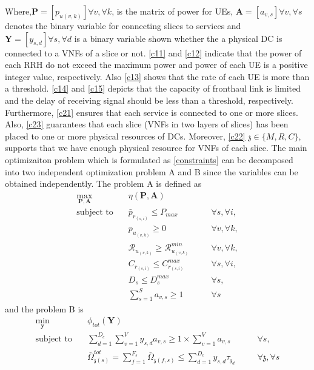 \documentclass[conference]{IEEEtran}
\begin{document}
Where,$\boldsymbol{P} =[p_{u(v,k)}]  \forall v , \forall k $, is the matrix of power for UEs, $\boldsymbol{A} =[a_{v,s}]  \forall v , \forall s $ denotes the binary variable for connecting slices to services and $\boldsymbol{Y} =[y_{s,d}]   \forall s ,  \forall d $ is a binary variable shown whether 
the a physical DC is connected to a VNFs of a slice or not. 
\eqref{c11} and \eqref{c12} indicate that the power of each RRH do not exceed the maximum power and power of each UE is a positive integer value, respectively. Also \eqref{c13} shows that the rate of each UE is more than a threshold. \eqref{c14} and \eqref{c15} depicts that the capacity of fronthaul link is limited and the delay of receiving signal should be less than a threshold, respectively.  
Furthermore, \eqref{c21}
ensures that each service is connected to one or more slices.
Also, \eqref{c23} guarantees that each slice (VNFs in two layers of slices) has been placed to one or more physical resources of DCs. Moreover, \eqref{c22}  $\mathfrak{z}\in \{M,R,C\}$, supports 
that we have enough physical resource for VNFs of each slice.\newline 
The main optimizaiton problem which is formulated as \eqref{constraints} can be decomposed into two independent optimization problem A and B since the variables can be obtained independently. The problem A is defined as 
\begin{subequations}
\begin{alignat}{4}
\max\limits_{\boldsymbol{P}, \boldsymbol{A} }   \quad &   \eta(\boldsymbol{P},\boldsymbol{A})\\
\text{subject to} \quad  & \bar{p}_{r_{(s,i)}} \leq P_{max} && \quad \forall s, \forall i,   \\
&p_{u_{(v,k)}}  \geq 0  &&\quad \forall v, \forall k, \\
&\mathcal{R}_{u_{(v,k)}} \geq  \mathcal{R}_{u_{(v,k)}}^{min} && \quad \forall v, \forall k, \\                                 
&C_{r_{(s,i)}} \leq C_{r_{(s,i)}}^{max}  &&\quad \forall s, \forall i,\label{cc14} \\
&D_{s} \leq D_{s}^{max}  &&\quad \forall s, \label{cc15} \\
& \sum_{s=1}^{S}a_{v,s} \geq 1 &&\quad \forall s
\end{alignat} 
\label{constraints1}
\end{subequations}
and the problem B is 
\begin{subequations}
\begin{alignat}{4}
\min\limits_{\boldsymbol{y} }   \quad &   \phi_{tot}(\boldsymbol{Y})\\
\text{subject to} \quad & \sum_{d=1}^{D_c}\sum_{v=1}^{V}y_{s,d}a_{v,s} \geq 1\times\sum_{v=1}^{V}a_{v,s} &&\quad \forall s, \\
&  \bar{\Omega}_{\mathfrak{z}(s)}^{tot} = \sum_{f=1}^{F_s}\bar{\Omega}_{\mathfrak{z}(f,s)} \leq  \sum_{d=1}^{D_c} y_{s,d} \tau_{\mathfrak{z}_d}                      
 && \quad \forall \mathfrak{z}, \forall s\label{eqomega}
\end{alignat}
\label{constraints2}
\end{subequations}
\end{document}
